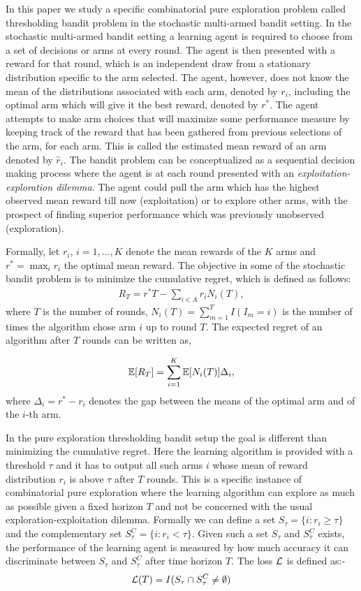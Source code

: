 In this paper we study a specific combinatorial pure exploration problem called thresholding bandit problem in the stochastic multi-armed bandit setting. In the stochastic multi-armed bandit setting a learning agent is required to choose from a set of decisions or arms at every round. The agent is then presented with a reward for that round, which is an independent draw from a stationary distribution specific to the arm selected. The agent, however, does not know the mean of the distributions associated with each arm, denoted by $r_{i}$, including the optimal arm which will give it the best reward, denoted by $r^{*}$. The agent attempts to make arm choices that will maximize some performance measure by keeping track of the reward that has been gathered from previous selections of the arm, for each arm. This is called the estimated mean reward of an arm denoted by $\hat{r}_{i}$. The bandit problem can be conceptualized as a sequential decision making process where the agent is at each round presented with an \emph{exploitation-exploration dilemma}. The agent could pull the arm which has the highest observed mean reward till now (exploitation) or to explore other arms, with the prospect of finding superior performance which was previously unobserved (exploration). 

	Formally, let $r_i$, $i=1,\ldots,K$ denote the mean rewards of the $K$ arms and $r^* = \max_i r_i$ the optimal mean reward. The objective in some of the stochastic bandit problem is to minimize the cumulative regret, which is defined as follows:
\begin{align*}
R_{T}=r^{*}T - \sum_{i\in A} r_{i}N_{i}(T),
\end{align*}
where $T$ is the number of rounds, $N_{i}(T)=\sum_{m=1}^T I(I_m=i)$ is the number of times the algorithm chose arm $i$ up to round $T$.
The expected regret of an algorithm after $T$ rounds can be written as,

\begin{align*}
\mathbb{E}[R_{T}]= \sum_{i=1}^K \mathbb{E}[N_i(T)] \Delta_i,
\end{align*}
where $\Delta_{i}=r^{*}-r_{i}$ denotes the gap between the means of the optimal arm and of the $i$-th arm. 

	In the pure exploration thresholding bandit setup the goal is different than minimizing the cumulative regret. Here the learning algorithm is provided with a threshold $\tau$ and it has to output all such arms $i$ whose mean of reward distribution $r_{i}$ is above $\tau$ after $T$ rounds. This is a specific instance of combinatorial pure exploration where the learning algorithm can explore as much as possible given a fixed horizon $T$ and not be concerned with the usual exploration-exploitation dilemma. Formally we can define a set $S_{\tau}=\lbrace i: r_{i}\geq \tau \rbrace$ and the complementary set $S_{\tau}^{C}=\lbrace i: r_{i} < \tau \rbrace$. Given such a set $S_{\tau}$ and $S_{\tau}^{C}$ exists, the performance of the learning agent is measured by how much accuracy it can discriminate between $S_{\tau}$ and $S_{\tau}^{C}$ after time horizon $T$. The loss $\mathcal{L}$ is defined as:-
\begin{align*}
\mathcal{L} (T) = I(S_{\tau}\cap S_{\tau}^{C} \neq \emptyset)
\end{align*}	
		
